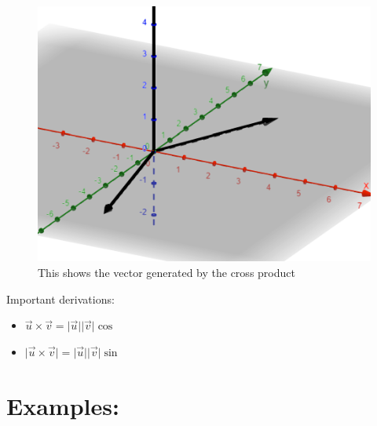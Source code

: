 \documentclass{article}
\newcommand{\abs}[1]{\lvert#1\rvert} %
\begin{document}
\begin{figure}[H]
    \includegraphics[scale=.5,trim=0 0 0 0]{crossProd.png} %
    \caption{This shows the vector generated by the cross product}
\end{figure}

Important derivations: 
\begin{itemize}
    \item $\vec{u} \times \vec{v} = \abs{\vec{u}}\abs{\vec{v}}\cos$
    \item $\abs{\vec{u} \times \vec{v}} = \abs{\vec{u}} \abs{\vec{v}}\sin$
\end{itemize}

\section*{Examples:}
\end{document}
